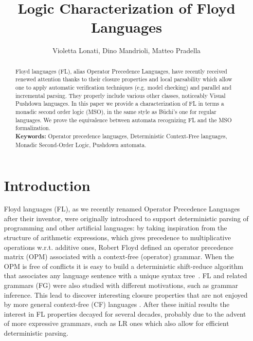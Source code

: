 \documentclass[10pt,a4paper,runningheads]{llncs}
\begin{document}
 

\title{Logic Characterization of Floyd Languages}
\author{Violetta Lonati, Dino Mandrioli, Matteo Pradella}





\maketitle

\begin{abstract}
  Floyd languages (FL), alias Operator Precedence Languages, have
  recently received renewed attention thanks to their closure
  properties and local parsability which allow one to apply automatic
  verification techniques (e.g. model checking) and parallel and
  incremental parsing. They properly include various other classes,
  noticeably Visual Pushdown languages. In this paper we provide a
  characterization of FL in terms a monadic second order logic (MSO),
  in the same style as B\"uchi's one for regular languages. We prove the
  equivalence between automata recognizing FL and the MSO
  formalization.
  \\
  {\bf Keywords: } Operator precedence languages, Deterministic
  Context-Free languages, Monadic Second-Order Logic, Pushdown
  automata.
\end{abstract}




\section{Introduction}
Floyd languages (FL), as we recently renamed Operator Precedence
Languages after their inventor, were originally introduced to support
deterministic parsing of programming and other artificial languages:
by taking inspiration from the structure of arithmetic expressions,
which gives precedence to multiplicative operations w.r.t. additive
ones, Robert Floyd defined an operator precedence matrix (OPM)
associated with a context-free (operator) grammar. When the OPM is
free of conflicts it is easy to build a deterministic shift-reduce
algorithm that associates any language sentence with a unique syntax
tree~\cite{Floyd1963}. FL and related grammars (FG) were also studied
with different motivations, such as grammar inference. This lead to
discover interesting closure properties that are not enjoyed by more
general context-free (CF) languages \cite{Crespi-ReghizziM12}. After
these initial results the interest in FL properties decayed for
several decades, probably due to the advent of more expressive
grammars, such as LR ones \cite{GruneJacobs:08} which also allow for
efficient deterministic parsing.
\end{document}
